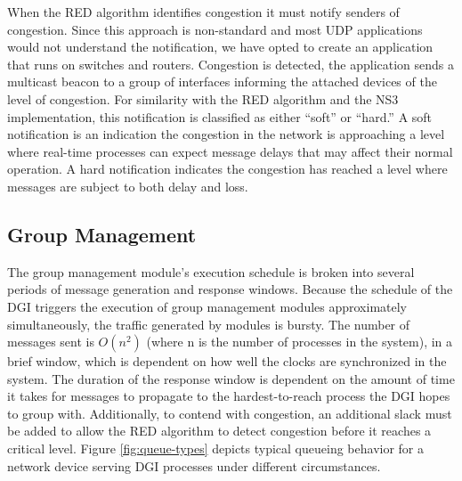 When the \ac{RED} algorithm identifies congestion it must notify senders of congestion.
Since this approach is non-standard and most UDP applications would not understand the notification, we have opted to create an application that runs on switches and routers.
Congestion is detected, the application sends a multicast beacon to a group of interfaces informing the attached devices of the level of congestion.
For similarity with the \ac{RED} algorithm and the \ac{NS3} implementation, this notification is classified as either ``soft'' or ``hard.''
A soft notification is an indication the congestion in the network is approaching a level where real-time processes can expect message delays that may affect their normal operation.
A hard notification indicates the congestion has reached a level where messages are subject to both delay and loss.

\subsection{Group Management}

The group management module's execution schedule is broken into several periods of message generation and response windows.
Because the schedule of the \ac{DGI} triggers the execution of group management modules approximately simultaneously, the traffic generated by modules is bursty.
The number of messages sent is $O(n^2)$ (where n is the number of processes in the system), in a brief window, which is dependent on how well the clocks are synchronized in the system.
The duration of the response window is dependent on the amount of time it takes for messages to propagate to the hardest-to-reach process the \ac{DGI} hopes to group with.
Additionally, to contend with congestion, an additional slack must be added to allow the \ac{RED} algorithm to detect congestion before it reaches a critical level.
Figure \ref{fig:queue-types} depicts typical queueing behavior for a network device serving \ac{DGI} processes under different circumstances.


